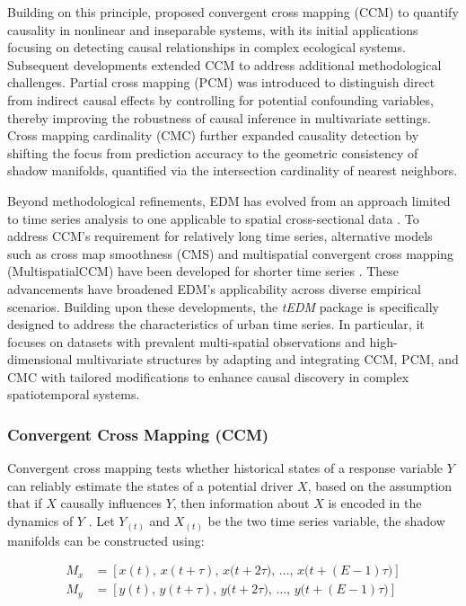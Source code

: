 \documentclass[authoryear,preprint,review,12pt]{elsarticle}
\begin{document}
Building on this principle, \citet{sugihara2012ccm} proposed convergent cross mapping (CCM) to quantify causality in nonlinear and inseparable systems, with its initial applications focusing on detecting causal relationships in complex ecological systems. Subsequent developments extended CCM to address additional methodological challenges. Partial cross mapping (PCM) \citep{leng2020pcm} was introduced to distinguish direct from indirect causal effects by controlling for potential confounding variables, thereby improving the robustness of causal inference in multivariate settings. Cross mapping cardinality (CMC) \citep{tao2023cmc} further expanded causality detection by shifting the focus from prediction accuracy to the geometric consistency of shadow manifolds, quantified via the intersection cardinality of nearest neighbors.

Beyond methodological refinements, EDM has evolved from an approach limited to time series analysis to one applicable to spatial cross-sectional data \citep{gao2023gccm}. To address CCM's requirement for relatively long time series, alternative models such as cross map smoothness (CMS) and multispatial convergent cross mapping (MultispatialCCM) have been developed for shorter time series \citep{ma2014cms,clark2015multispatialccm}. These advancements have broadened EDM’s applicability across diverse empirical scenarios. Building upon these developments, the \textit{tEDM} package is specifically designed to address the characteristics of urban time series. In particular, it focuses on datasets with prevalent multi-spatial observations and high-dimensional multivariate structures by adapting and integrating CCM, PCM, and CMC with tailored modifications to enhance causal discovery in complex spatiotemporal systems.

\subsubsection{Convergent Cross Mapping (CCM)}

Convergent cross mapping tests whether historical states of a response variable $Y$ can reliably estimate the states of a potential driver $X$, based on the assumption that if $X$ causally influences $Y$, then information about $X$ is encoded in the dynamics of $Y$ \citep{sugihara2012ccm}. Let $Y_{(t)}$ and $X_{(t)}$ be the two time series variable, the shadow manifolds can be constructed using:

\begin{equation}\label{eq_ts_embedding}
\begin{split}
M_{x} &= \left[ x(t),\, x(t+\tau),\, x\big(t+2\tau\big),\, \ldots,\, x\big(t+(E - 1)\tau\big) \right] \\
M_{y} &= \left[ y(t),\, y(t+\tau),\, y\big(t+2\tau\big),\, \ldots,\, y\big(t+(E - 1)\tau\big) \right]
\end{split}
\end{equation}
\end{document}
